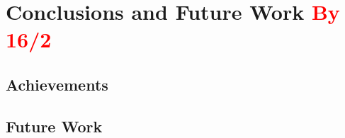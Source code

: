 \chapter{Conclusions and Future Work \textcolor{red}{By 16/2}}
\label{chapter:conclusions}

\section{Achievements}
\label{sec:chp7-1_achievements}


\section{Future Work}
\label{sec:chp7-2_future_work}